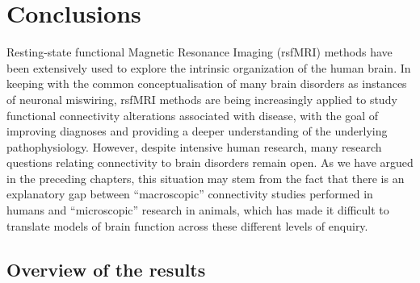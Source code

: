 \chapter{Conclusions}

\label{Chapter05}

Resting-state functional Magnetic Resonance Imaging (rsfMRI) methods have been
extensively used to explore the intrinsic organization of the human brain. In
keeping with the common conceptualisation of many brain disorders as instances
of neuronal miswiring, rsfMRI methods are being increasingly applied to study
functional connectivity alterations associated with disease, with the goal of
improving diagnoses and providing a deeper understanding of the underlying
pathophysiology. However, despite intensive human research, many research
questions relating connectivity to brain disorders remain open. As we have
argued in the preceding chapters, this situation may stem from the fact that
there is an explanatory gap between ``macroscopic'' connectivity studies
performed in humans and ``microscopic'' research in animals, which has made it
difficult to translate models of brain function across these different levels of
enquiry. 

\section{Overview of the results}

